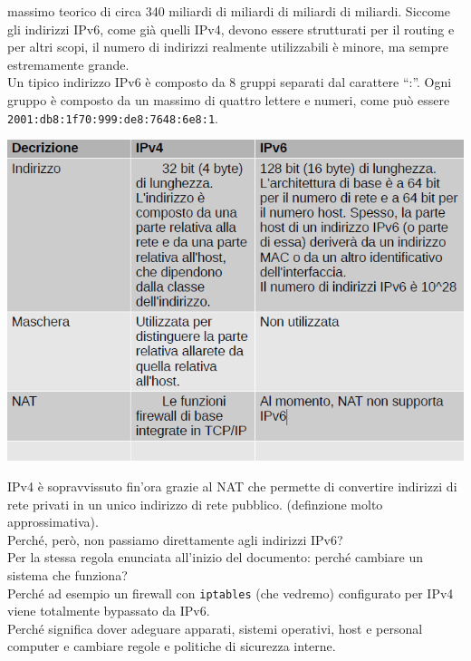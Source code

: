 \documentclass[a4paper]{report}
\begin{document}
massimo teorico di circa 340 miliardi di miliardi di miliardi di
miliardi. Siccome gli indirizzi IPv6, come già quelli IPv4, devono
essere strutturati per il routing e per altri scopi, il numero di indirizzi
realmente utilizzabili è minore, ma sempre estremamente grande.\\
Un tipico indirizzo IPv6 è composto da 8 gruppi
separati dal carattere “:”. Ogni gruppo è composto
da un massimo di quattro lettere e numeri, come
può essere \texttt{2001:db8:1f70:999:de8:7648:6e8:1}.\\
\begin{center}
\includegraphics[scale=0.65]{ipv4vsipv6.png}
\end{center}
IPv4 è sopravvissuto fin'ora grazie al NAT che
permette di convertire indirizzi di rete privati in
un unico indirizzo di rete pubblico. (definzione
molto approssimativa).\\
Perché, però, non passiamo direttamente agli indirizzi IPv6? \\
Per la stessa regola enunciata all'inizio del documento: perché cambiare un sistema che funziona?\\
Perché ad esempio un firewall con \texttt{iptables} (che
vedremo) configurato per IPv4 viene totalmente
bypassato da IPv6.\\
Perché significa dover adeguare apparati,
sistemi operativi, host e personal computer e
cambiare regole e politiche di sicurezza interne.
\end{document}
